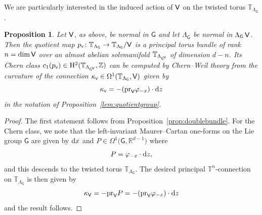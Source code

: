 \documentclass[pdftex]{sigma}
\numberwithin{equation}{section}
\newcommand{\Z}{\zed}
\def\dd{{\rm d}}
\def\V{{\sf V}}
\newcommand{\sfG}{\mathsf{G}}
\newcommand{\rmH}{{\rm H}}
\newcommand{\R}{\real}
\newcommand{\zed}{{\mathbb Z}} %
\newcommand{\real}{{\mathbb R}} %
\newcommand{\torus}{{\mathbb T}} %
\newtheorem{Proposition}[Theorem]{Proposition}
 { \theoremstyle{definition}
\newtheorem{Definition}[Theorem]{Definition}
\newtheorem{Note}[Theorem]{Note}
\newtheorem{Example}[Theorem]{Example}
\newtheorem{Remark}[Theorem]{Remark} }
\begin{document}
We are particularly interested in the induced action of $\V$ on the twisted torus $\torus_{\Lambda_\sfG}$.

\begin{Proposition}\label{lem:quotienttorus}
Let $\V$, as above, be normal in $\sfG$ and let $\Lambda_\sfG$ be
normal in $\Lambda_\sfG\,\V$. Then the quotient map
$p_{\text{\tiny{$\V$}}}\colon \torus_{\Lambda_\sfG}\to\torus_{\Lambda_\sfG}/\V$
is a principal torus bundle of rank~$n=\dim \V$ over an almost abelian
solvmanifold $\torus_{\Lambda_{\sfG^{\text{\tiny$\V$}}}}$ of
dimension $d{-}n$. Its Chern class
$c_1(p_{\text{\tiny{$\V$}}})\in\rmH^2(\torus_{\Lambda_{\sfG^{\text{\tiny$\V$}}}},\Z)$
can be computed by Chern--Weil theory from the curvature of the
connection $\kappa_{\text{\tiny{$\V$}}}\in\Omega^1(\torus_{\Lambda_\sfG},\V)$ given by
\[
\kappa_{\text{\tiny{$\V$}}} = - ({\rm pr}_\V \varphi_{-x})\cdot \dd z
\]
in the notation of Proposition~{\rm \ref{lem:quotientgroup}}.
\end{Proposition}
\begin{proof}
The first statement follows from Proposition~\ref{prop:doublebundle}.
For the Chern class, we note that the left-invariant Maurer--Cartan
one-forms on the Lie group $\sfG$ are given by $\dd x$ and
$P\in\Omega^1\big(\sfG,\R^{d-1}\big)$ where
\[
P = \varphi_{-x}\cdot \dd z ,
\]
and this descends to the twisted torus $\torus_{\Lambda_\sfG}$.
The desired principal $\torus^n$-connection on $\torus_{\Lambda_\sfG}$
is then given by
\[
\kappa_\V=-{\rm pr}_\V P = -({\rm pr}_\V \varphi_{-x})\cdot \dd z
\]
and the result follows.
\end{proof}
\end{document}
